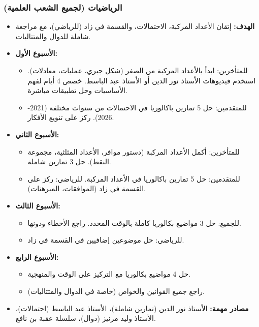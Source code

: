 \documentclass[12pt,a4paper]{book}
\begin{document}
	\subsubsection*{الرياضيات (لجميع الشعب العلمية)}
	\begin{itemize}
		\item \textbf{الهدف:} إتقان الأعداد المركبة، الاحتمالات، والقسمة في زاد (للرياضي)، مع مراجعة شاملة للدوال والمتتاليات.
		\item \textbf{الأسبوع الأول:}
		\begin{itemize}
			\item للمتأخرين: ابدأ بالأعداد المركبة من الصفر (شكل جبري، عمليات، معادلات). استخدم فيديوهات الأستاذ نور الدين أو الأستاذ عبد الباسط. خصص 4 أيام لفهم الأساسيات وحل تطبيقات مباشرة.
			\item للمتقدمين: حل 5 تمارين باكالوريا في الاحتمالات من سنوات مختلفة (2021-2026). ركز على تنويع الأفكار.
		\end{itemize}
		\item \textbf{الأسبوع الثاني:}
		\begin{itemize}
			\item للمتأخرين: أكمل الأعداد المركبة (دستور موافر، الأعداد المثلثية، مجموعة النقط). حل 3 تمارين شاملة.
			\item للمتقدمين: حل 5 تمارين باكالوريا في الأعداد المركبة. للرياضي: ركز على القسمة في زاد (الموافقات، المبرهنات).
		\end{itemize}
		\item \textbf{الأسبوع الثالث:}
		\begin{itemize}
			\item للجميع: حل 3 مواضيع بكالوريا كاملة بالوقت المحدد. راجع الأخطاء ودونها.
			\item للرياضي: حل موضوعين إضافيين في القسمة في زاد.
		\end{itemize}
		\item \textbf{الأسبوع الرابع:}
		\begin{itemize}
			\item حل 4 مواضيع بكالوريا مع التركيز على الوقت والمنهجية.
			\item راجع جميع القوانين والخواص (خاصة في الدوال والمتتاليات).
		\end{itemize}
		\item \textbf{مصادر مهمة:} الأستاذ نور الدين (تمارين شاملة)، الأستاذ عبد الباسط (احتمالات)، الأستاذ وليد مرنيز (دوال)، سلسلة عقبة بن نافع.
	\end{itemize}
	
\end{document}
